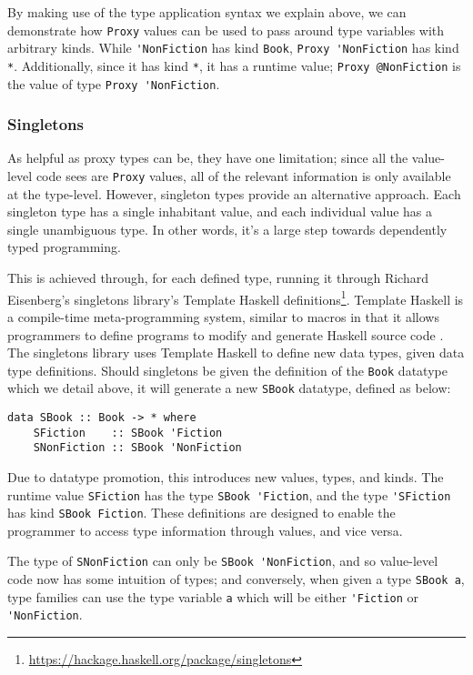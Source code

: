 \documentclass[12pt, a4paper, bibliography=totocnumbered]{scrreprt}
\newcommand{\inline}[1]{\lstinline[basicstyle=\ttfamily\footnotesize]{#1}}
\begin{document}
By making use of the type application syntax we explain above, we can demonstrate how \inline{Proxy} values can be used to pass around type variables with arbitrary kinds. While \inline{'NonFiction} has kind \inline{Book}, \inline{Proxy 'NonFiction} has kind \inline{*}. Additionally, since it has kind \inline{*}, it has a runtime value; \inline{Proxy @NonFiction} is the value of type \inline{Proxy 'NonFiction}.

\subsubsection{Singletons}

As helpful as proxy types can be, they have one limitation; since all the value-level code sees are \inline{Proxy} values, all of the relevant information is only available at the type-level. However, singleton types \cite{singletons} provide an alternative approach. Each singleton type has a single inhabitant value, and each individual value has a single unambiguous type. In other words, it's a large step towards dependently typed programming.

This is achieved through, for each defined type, running it through Richard Eisenberg's singletons library's Template Haskell definitions\footnote{\url{https://hackage.haskell.org/package/singletons}}. Template Haskell is a compile-time meta-programming system, similar to macros in that it allows programmers to define programs to modify and generate Haskell source code \cite{templatehaskell}. The singletons library uses Template Haskell to define new data types, given data type definitions. Should singletons be given the definition of the \inline{Book} datatype which we detail above, it will generate a new \inline{SBook} datatype, defined as below:

\begin{lstlisting}
data SBook :: Book -> * where
    SFiction    :: SBook 'Fiction
    SNonFiction :: SBook 'NonFiction
\end{lstlisting}

Due to datatype promotion, this introduces new values, types, and kinds. The runtime value \inline{SFiction} has the type \inline{SBook 'Fiction}, and the type \inline{'SFiction} has kind \inline{SBook Fiction}. These definitions are designed to enable the programmer to access type information through values, and vice versa.

The type of \inline{SNonFiction} can only be \inline{SBook 'NonFiction}, and so value-level code now has some intuition of types; and conversely, when given a type \inline{SBook a}, type families can use the type variable \inline{a} which will be either \inline{'Fiction} or \inline{'NonFiction}.
\end{document}

